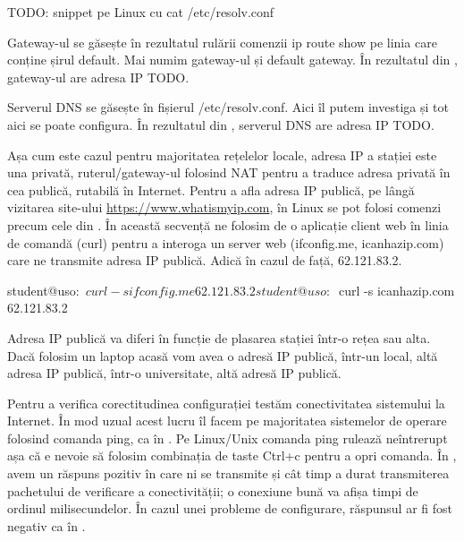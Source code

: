 \begin{screen}[caption={Afișarea serverului DNS (în Linux)},label={lst:net:show-dns}]
TODO: snippet pe Linux cu cat /etc/resolv.conf
\end{screen}

Gateway-ul se găsește în rezultatul rulării comenzii ip route show pe linia care conține șirul default. Mai numim gateway-ul și default gateway. În rezultatul din , gateway-ul are adresa IP TODO.

Serverul DNS se găsește în fișierul /etc/resolv.conf. Aici îl putem investiga și tot aici se poate configura. În rezultatul din , serverul DNS are adresa IP TODO.

Așa cum este cazul pentru majoritatea rețelelor locale, adresa IP a stației este una privată, ruterul/gateway-ul folosind NAT pentru a traduce adresa privată în cea publică, rutabilă în Internet. Pentru a afla adresa IP publică, pe lângă vizitarea site-ului \url{https://www.whatismyip.com}, în Linux se pot folosi comenzi precum cele din . În această secvență ne folosim de o aplicație client web în linia de comandă (curl) pentru a interoga un server web (ifconfig.me, icanhazip.com) care ne transmite adresa IP publică. Adică în cazul de față, 62.121.83.2.

\begin{screen}[caption={Aflarea adresei IP publice în linia de comandă},label={lst:sec:show-public-address}]
student@uso:~$ curl -s ifconfig.me
62.121.83.2
student@uso:~$ curl -s icanhazip.com
62.121.83.2
\end{screen}

Adresa IP publică va diferi în funcție de plasarea stației într-o rețea sau alta. Dacă folosim un laptop acasă vom avea o adresă IP publică, într-un local, altă adresa IP publică, într-o universitate, altă adresă IP publică.

Pentru a verifica corectitudinea configurației testăm conectivitatea sistemului la Internet. În mod uzual acest lucru îl facem pe majoritatea sistemelor de operare folosind comanda ping, ca în . Pe Linux/Unix comanda ping rulează neîntrerupt așa că e nevoie să folosim combinația de taste Ctrl+c pentru a opri comanda. În , avem un răspuns pozitiv în care ni se transmite și cât timp a durat transmiterea pachetului de verificare a conectivității; o conexiune bună va afișa timpi de ordinul milisecundelor. În cazul unei probleme de configurare, răspunsul ar fi fost negativ ca în .

